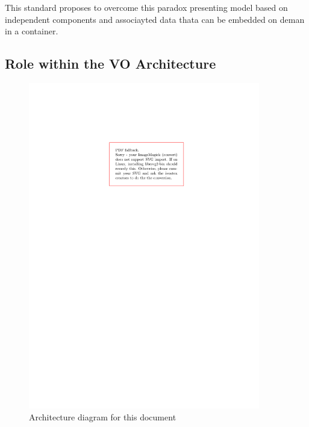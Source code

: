 \documentclass[11pt,a4paper]{ivoa}
\begin{document}
This standard proposes to overcome this paradox presenting model based on independent components and associayted data thata can be embedded on deman in a container.


\subsection{Role within the VO Architecture}

\begin{figure}
\centering


\includegraphics[width=0.9\textwidth]{role_diagram.pdf}
\caption{Architecture diagram for this document}
\label{fig:archdiag}
\end{figure}
\end{document}
